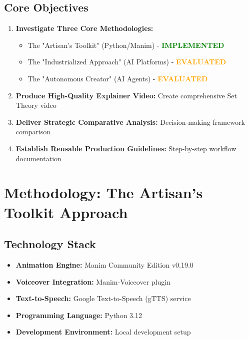 \documentclass[12pt,a4paper]{article}
\begin{document}
\subsection{Core Objectives}
\begin{enumerate}
    \item \textbf{Investigate Three Core Methodologies:}
    \begin{itemize}
        \item The "Artisan's Toolkit" (Python/Manim) - \textcolor{green}{\textbf{IMPLEMENTED}}
        \item The "Industrialized Approach" (AI Platforms) - \textcolor{orange}{\textbf{EVALUATED}}
        \item The "Autonomous Creator" (AI Agents) - \textcolor{orange}{\textbf{EVALUATED}}
    \end{itemize}
    
    \item \textbf{Produce High-Quality Explainer Video:} Create comprehensive Set Theory video
    
    \item \textbf{Deliver Strategic Comparative Analysis:} Decision-making framework comparison
    
    \item \textbf{Establish Reusable Production Guidelines:} Step-by-step workflow documentation
\end{enumerate}

\section{Methodology: The Artisan's Toolkit Approach}

\subsection{Technology Stack}
\begin{itemize}
    \item \textbf{Animation Engine:} Manim Community Edition v0.19.0
    \item \textbf{Voiceover Integration:} Manim-Voiceover plugin
    \item \textbf{Text-to-Speech:} Google Text-to-Speech (gTTS) service
    \item \textbf{Programming Language:} Python 3.12
    \item \textbf{Development Environment:} Local development setup
\end{itemize}
\end{document}
